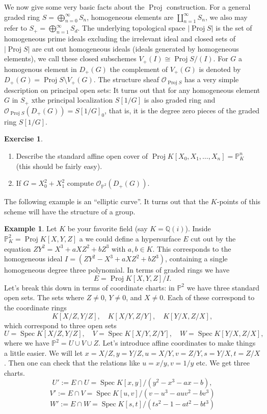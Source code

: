 \documentclass[12pt]{article}
\numberwithin{equation}{section}
\theoremstyle{definition}
\newtheorem{example}[theorem]{Example}
\newtheorem{exercise}[theorem]{Exercise}
\theoremstyle{remark}
\newcommand{\QQ}{\mathbb{Q}}
\newcommand{\Ocal}{\mathcal{O}}
\newcommand{\PP}{\mathbb{P}}
\newcommand{\Spec}{\operatorname{Spec}}
\newcommand{\Proj}{\operatorname{Proj}}
\begin{document}
We now give some very basic facts about the $\Proj$ construction. 
For a general graded ring $S = \bigoplus_{n=0}^{\infty} S_n$, homogeneous elements are $\coprod_{n=1}^{\infty} S_n$, we also may refer to $S_+ = \bigoplus_{n=1}^{\infty} S_d$.
The underlying topological space $\vert \Proj S\vert$ is the set of homogeneous prime ideals excluding the irrelevant ideal and closed sets of $\vert \Proj S \vert$ are cut out homogeneous ideals (ideals generated by homogeneous elements), we call these closed subschemes $V_+(I) \cong \Proj S/(I)$.
For $G$ a homogenous element in $D_+(G)$ the complement of $V_+(G)$ is denoted by 
 $D_+(G) = \Proj S \setminus V_+(G)$. 
The structure sheaf $\Ocal_{\Proj S}$ has a very simple description on principal open sets:
It turns out that for any homogeneous element $G$ in $S_+$ xthe principal localization $S[1/G]$ is also graded ring and $\Ocal_{\Proj S}(D_+(G)) = S[1/G]_0$, that is, it is the degree zero pieces of the graded ring $S[1/G]$.

\begin{exercise}
	\begin{enumerate}
		\item Describe the standard affine open cover of $\Proj K[X_0,X_1,\ldots, X_n] = \PP^n_K$ (this should be fairly easy).
		\item If $G = X_0^2+X_1^2$ compute $\Ocal_{\PP^2}(D_+(G))$.
	\end{enumerate}
\end{exercise}

The following example is an ``elliptic curve''. 
It turns out that the $K$-points of this scheme will have the structure of a group.
\begin{example}
	Let $K$ be your favorite field (say $K=\QQ(i)$).
	Inside $\PP^2_{K} = \Proj K[X,Y,Z]$ a we could define a hypersurface $E$  cut out by the equation $ZY^2=X^3+aXZ^2+bZ^3$ with $a,b\in K$.
	This corresponds to the homogeneous ideal $I = (ZY^2-X^3+aXZ^2+bZ^3)$, containing a single homogeneous degree three polynomial. 
	In terms of graded rings we have 
	 $$ E = \Proj K[X,Y,Z]/I. $$
	Let's break this down in terms of coordinate charts: in $\PP^2$ we have three standard open sets. 
	The sets where $Z\neq 0$, $Y\neq 0$, and $X\neq 0$. 
	Each of these correspond to the coordinate rings 
	 $$ K[X/Z,Y/Z], \quad K[X/Y,Z/Y], \quad K[Y/X,Z/X],$$
	which correspond to three open sets 
	 $$ U=\Spec K[X/Z,Y/Z], \quad V = \Spec K[X/Y,Z/Y], \quad W = \Spec K[Y/X,Z/X],$$
	where we have $\PP^2 = U \cup V \cup Z$. 
	Let's introduce affine coordinates to make things a little easier. 
	We will let $x = X/Z, y=Y/Z, u = X/Y, v=Z/Y, s=Y/X, t=Z/X$. 
	Then one can check that the relations like $u=x/y, v = 1/y$ etc.
	We get three charts.
	 $$U':=E\cap U = \Spec K[x,y]/(y^2-x^3-ax-b), $$
	 $$V':=E \cap V = \Spec K[u,v]/(v-u^3-auv^2-bv^3)$$
	 $$W':=E \cap W = \Spec K[s,t]/(ts^2-1-at^2-bt^3)$$
\end{example}
\end{document}
